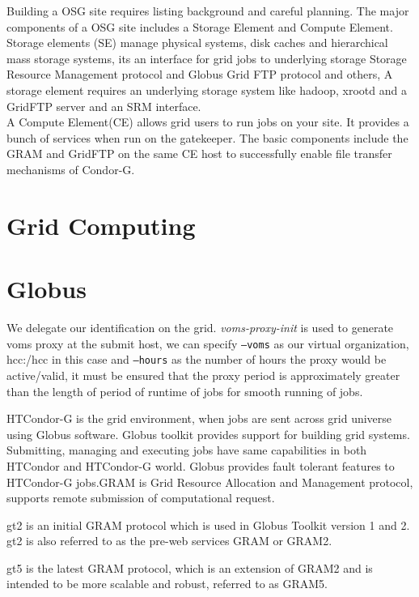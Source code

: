 \documentclass[ms,electronic,double]{nuthesis}
\begin{document}
Building a OSG site requires listing background and careful planning. The major 
components of a OSG site includes a Storage Element and Compute Element. \\

Storage elements (SE) manage physical systems, disk caches and hierarchical mass storage 
systems, its an interface for grid jobs to underlying storage Storage Resource Management protocol and Globus 
Grid FTP protocol and others, A storage element requires an underlying storage system like hadoop, xrootd
and a GridFTP server and an SRM interface.\\

A Compute Element(CE) allows grid users to run jobs on your site. It provides a 
bunch of services when run on the gatekeeper. The basic components include 
the GRAM and GridFTP on the same CE host to successfully enable file transfer 
mechanisms of Condor-G.\\

\section{Grid Computing}

\section{Globus}

We delegate our identification on the grid. \emph{voms-proxy-init}
is used to generate voms proxy at the submit host, we can specify \texttt{--voms} as our 
virtual organization, hcc:/hcc in this case and \texttt{--hours} as the number of hours the proxy would be 
active/valid, it must be ensured that the proxy period is approximately greater than the 
length of period of runtime of jobs for smooth running of jobs.

HTCondor-G is the grid environment, when jobs are sent across grid universe using 
Globus software. Globus toolkit provides support for building grid systems. 
Submitting, managing and executing jobs have same capabilities in both HTCondor 
and HTCondor-G world. Globus provides fault tolerant features to HTCondor-G 
jobs.GRAM is Grid Resource Allocation and Management protocol, supports remote 
submission of computational request.

gt2 is an initial GRAM protocol which is used in Globus Toolkit version 1 and 
2. gt2 is also referred to as the pre-web services GRAM or GRAM2.

gt5 is the latest GRAM protocol, which is an extension of GRAM2 and is intended 
to be more scalable and robust, referred to as GRAM5.
\end{document}
